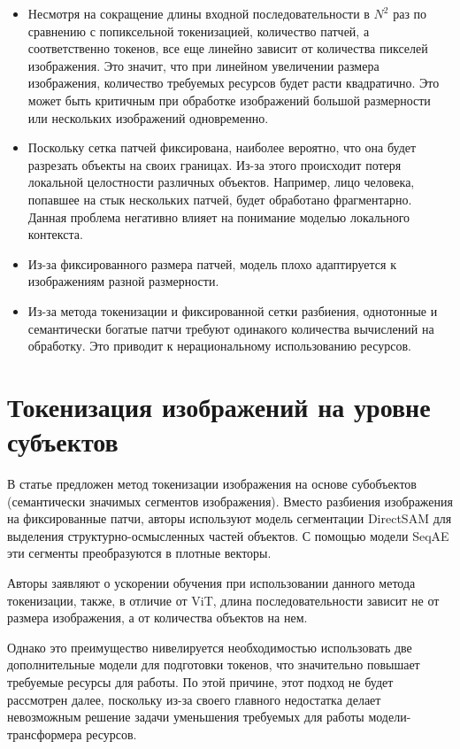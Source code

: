 \documentclass[times,specification,annotation]{itmo-student-thesis}
\begin{document}
\begin{itemize}
    \item Несмотря на сокращение длины входной последовательности в $N^2$ раз по сравнению с попиксельной токенизацией, количество патчей, а соответственно токенов, все еще линейно зависит от количества пикселей изображения. Это значит, что при линейном увеличении размера изображения, количество требуемых ресурсов будет расти квадратично. Это может быть критичным при обработке изображений большой размерности или нескольких изображений одновременно.

    \item Поскольку сетка патчей фиксирована, наиболее вероятно, что она будет разрезать объекты на своих границах. Из-за этого происходит потеря локальной целостности различных объектов. Например, лицо человека, попавшее на стык нескольких патчей, будет обработано фрагментарно. Данная проблема негативно влияет на понимание моделью локального контекста.
    
    \item Из-за фиксированного размера патчей, модель плохо адаптируется к изображениям разной размерности.  

    \item Из-за метода токенизации и фиксированной сетки разбиения, однотонные и семантически богатые патчи требуют одинакого количества вычислений на обработку. Это приводит к нерациональному использованию ресурсов.
\end{itemize}

\section{Токенизация изображений на уровне субъектов}

В статье \cite{subobject_tokenization} предложен метод токенизации изображения на основе субобъектов (семантически значимых сегментов изображения). Вместо разбиения изображения на фиксированные патчи, авторы используют модель сегментации DirectSAM для выделения структурно-осмысленных частей объектов. С помощью модели SeqAE эти сегменты преобразуются в плотные векторы.

Авторы заявляют о ускорении обучения при использовании данного метода токенизации, также, в отличие от ViT, длина последовательности зависит не от размера изображения,  а от количества объектов на нем. 

Однако это преимущество нивелируется необходимостью использовать две дополнительные модели для подготовки токенов, что значительно повышает требуемые ресурсы для работы. По этой причине, этот подход не будет рассмотрен далее, поскольку из-за своего главного недостатка делает невозможным решение задачи уменьшения требуемых для работы модели-трансформера ресурсов.
\end{document}
